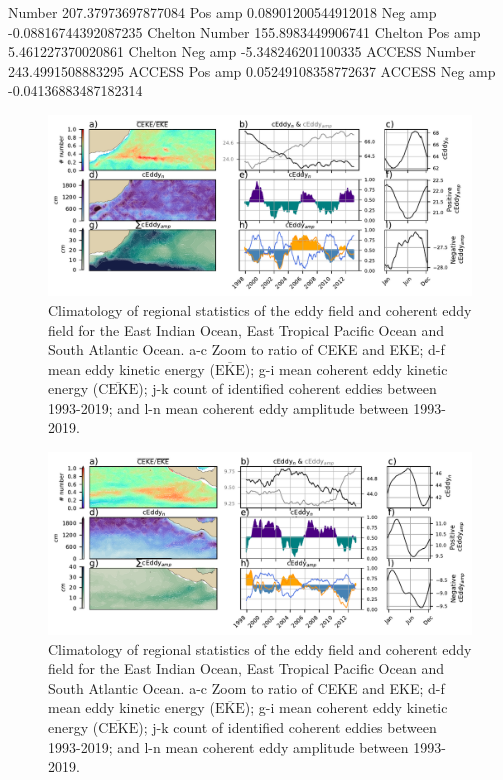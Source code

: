 \documentclass[draft,linenumbers]{agujournal2019}
\newcommand{\MEKE}{\overline{\textrm{EKE}}}
\newcommand{\MCEKE}{\overline{\textrm{CEKE}}}
\begin{document}
	Number 207.37973697877084
	Pos amp 0.08901200544912018
	Neg amp -0.08816744392087235
	Chelton Number 155.8983449906741
	Chelton Pos amp 5.461227370020861
	Chelton Neg amp -5.348246201100335
	ACCESS Number 243.4991508883295
	ACCESS Pos amp 0.05249108358772637
	ACCESS Neg amp -0.04136883487182314

	\begin{figure}
	    \centering
	    \includegraphics[width=1\textwidth]{figures/regional_ratios_and_stats_2.pdf}
	    \caption{Climatology of regional statistics of the eddy field and coherent eddy field for the East Indian Ocean, East Tropical Pacific Ocean and South Atlantic Ocean. a-c Zoom to ratio of CEKE and EKE; d-f  mean eddy kinetic energy ($\MEKE$); g-i mean coherent eddy kinetic energy ($\MCEKE$); j-k count of identified coherent eddies between 1993-2019; and l-n mean coherent eddy amplitude between 1993-2019.}
	    \label{fig:south_atlantic_cycle}
	\end{figure}


	\begin{figure}
	    \centering
	    \includegraphics[width=1\textwidth]{figures/regional_ratios_and_stats_3.pdf}
	    \caption{Climatology of regional statistics of the eddy field and coherent eddy field for the East Indian Ocean, East Tropical Pacific Ocean and South Atlantic Ocean. a-c Zoom to ratio of CEKE and EKE; d-f  mean eddy kinetic energy ($\MEKE$); g-i mean coherent eddy kinetic energy ($\MCEKE$); j-k count of identified coherent eddies between 1993-2019; and l-n mean coherent eddy amplitude between 1993-2019.}
	    \label{fig:south_atlantic_cycle}
	\end{figure}
\end{document}
